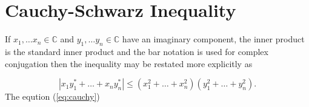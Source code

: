 \documentclass[12pt, a4paper]{article}
\begin{document}
\section{Cauchy-Schwarz Inequality}
If $x_{1}, \ldots x_{n} \in \mathbb{C}$ and $y_{1}, \ldots y_{n} \in \mathbb{C}$ have an imaginary component, the inner product is the standard inner product and the bar notation is used for complex conjugation then  the inequality may be restated more explicitly as

\setcounter{equation}{40} 
\begin{equation}
\label{eq:cauchy}
|x_{1}  y^{*}_{1} + \ldots + x_{n} y^{*}_{n}| \leq (x_{1}^{2} + \ldots + x_{n}^{2})(y_{1}^{2}+ \ldots + y_{n}^{2}).
\end{equation}
The eqution (\ref{eq:cauchy})
\end{document}
